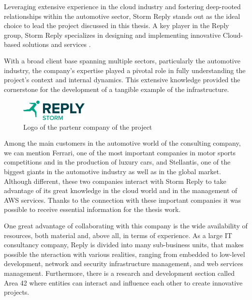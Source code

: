 Leveraging extensive experience in the cloud industry and fostering deep-rooted relationships within the automotive sector, Storm Reply stands out as the ideal choice to lead the project discussed in this thesis. A key player in the Reply group, Storm Reply specializes in designing and implementing innovative Cloud-based solutions and services \cite{StormReplySite}. 

With a broad client base spanning multiple sectors, particularly the automotive industry, the company's expertise played a pivotal role in fully understanding the project's context and internal dynamics. This extensive knowledge provided the cornerstone for the development of a tangible example of the infrastructure.

\begin{figure}[h]  %
  \centering
  \includegraphics[width=0.3\textwidth]{images/Storm_Reply_logo.png}  %
  \caption{Logo of the partenr company of the project}
  \label{fig:StormReplyLogo}
\end{figure}

Among the main customers in the automotive world of the consulting company, we can mention Ferrari, one of the most important companies in motor sports competitions and in the production of luxury cars, and Stellantis, one of the biggest giants in the automotive industry as well as in the global market. Although different, these two companies interact with Storm Reply to take advantage of its great knowledge in the cloud world and in the management of AWS services. Thanks to the connection with these important companies it was possible to receive essential information for the thesis work.

One great advantage of collaborating with this company is the wide availability of resources, both material and, above all, in terms of experience. As a large IT consultancy company, Reply is divided into many sub-business units, that makes possible the nteraction with various realities, ranging from embedded to low-level development, network and security infrastructure management, and web services management. Furthermore, there is a research and development section called Area 42 where entities can interact and influence each other to create innovative projects.

